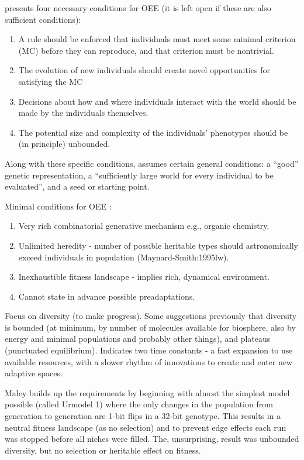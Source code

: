 \parencite{Soros2014} presents four necessary conditions for OEE (it is left open if these are also sufficient conditions):
\begin{enumerate}
	\item A rule should be enforced that individuals must meet some minimal criterion (MC) before they can reproduce, and that criterion must be nontrivial.
	\item The evolution of new individuals should create novel opportunities for satisfying the MC
	\item Decisions about how and where individuals interact with the world should be made by the individuals themselves.
	\item The potential size and complexity of the individuals' phenotypes should be (in principle) unbounded.
\end{enumerate}
Along with these specific conditions, \parencite{Soros2014} assumes certain general conditions: a ``good'' genetic representation, a ``sufficiently large world for every individual to be evaluated'', and a seed or starting point.

Minimal conditions for OEE \parencite{Vasas2015}:
\begin{enumerate}
\item Very rich combinatorial generative mechanism e.g., organic chemistry.
\item Unlimited heredity - number of possible heritable types should astronomically exceed individuals in population (Maynard-Smith:1995lw).
\item Inexhaustible fitness landscape - implies rich, dynamical environment.
\item Cannot state in advance possible preadaptations.
\end{enumerate}

\parencite{Maley1999}

Focus on diversity (to make progress). Some suggestions previously that diversity is bounded (at minimum, by number of molecules available for biosphere, also by energy and minimal populations and probably other things), and plateaus (punctuated equilibrium). Indicates two time constants - a fast expansion to use available resources, with a slower rhythm of innovations to create and enter new adaptive spaces.

Maley builds up the requirements by beginning with almost the simplest model possible (called Urmodel 1) where the only changes in the population from generation to generation are 1-bit flips in a 32-bit genotype. This results in a neutral fitness landscape (as no selection) and to prevent edge effects each run was stopped before all niches were filled. The, unsurprising, result was unbounded diversity, but no selection or heritable effect on fitness.

